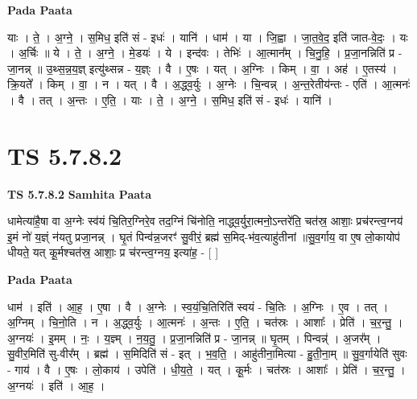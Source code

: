 \documentclass[17pt]{extarticle}
\begin{document}
\textbf{Pada Paata} \newline

याः । ते॒ । अ॒ग्ने॒ । स॒मिध॒ इति॑ सं - इधः॑ । यानि॑ । धाम॑ । या । जि॒ह्वा । जा॒त॒वे॒द॒ इति॑ जात-वे॒दः॒ । यः । अ॒र्चिः ॥ ये । ते॒ । अ॒ग्ने॒ । मे॒डयः॑ । ये । इन्द॑वः । तेभिः॑ । आ॒त्मान᳚म् । चि॒नु॒हि॒ । प्र॒जा॒नन्निति॑ प्र - जा॒नन्न् ॥ उ॒थ्स॒न्न॒य॒ज्ञ् इत्यु॑थ्सन्न - य॒ज्ञ्ः । वै । ए॒षः । यत् । अ॒ग्निः । किम् । वा॒ । अह॑ । ए॒तस्य॑ । क्रि॒यते᳚ । किम् । वा॒ । न । यत् । वै । अ॒द्ध्व॒र्युः । अ॒ग्नेः । चि॒न्वन्न् । अ॒न्त॒रेतीय॑न्तः - एति॑ । आ॒त्मनः॑ । वै । तत् । अ॒न्तः । ए॒ति॒ । याः । ते॒ । अ॒ग्ने॒ । स॒मिध॒ इति॑ सं - इधः॑ । यानि॑ ।  \newline




\section*{ TS 5.7.8.2 }

\textbf{TS 5.7.8.2 } \newline
\textbf{Samhita Paata} \newline

धामेत्या॑है॒षा वा अ॒ग्नेः स्व॑यं चि॒तिर॒ग्निरे॒व तद॒ग्निं चि॑नोति॒ नाद्ध्व॒र्युरा॒त्मनो॒ऽन्तरे॑ति॒ चत॑स्र॒ आशाः॒ प्रच॑रन्त्व॒ग्नय॑ इ॒मं नो॑ य॒ज्ञ्ं न॑यतु प्रजा॒नन्न्  । घृ॒तं पिन्व॑न्न॒जरꣳ॑ सु॒वीरं॒ ब्रह्म॑ स॒मिद्-भ॑व॒त्याहु॑तीनां ॥सु॒व॒र्गाय॒ वा ए॒ष लो॒कायोप॑ धीयते॒ यत् कू॒र्मश्चत॑स्र॒ आशाः॒ प्र च॑रन्त्व॒ग्नय॒ इत्या॑ह॒ - [  ] \newline

\textbf{Pada Paata} \newline

धाम॑ । इति॑ । आ॒ह॒ । ए॒षा । वै । अ॒ग्नेः । स्व॒यं॒चि॒तिरिति॑ स्वयं - चि॒तिः । अ॒ग्निः । ए॒व । तत् । अ॒ग्निम् । चि॒नो॒ति । न । अ॒द्ध्व॒र्युः । आ॒त्मनः॑ । अ॒न्तः । ए॒ति॒ । चत॑स्रः । आशाः᳚ । प्रेति॑ । च॒र॒न्तु॒ । अ॒ग्नयः॑ । इ॒मम् । नः॒ । य॒ज्ञ्म् । न॒य॒तु॒ । प्र॒जा॒नन्निति॑ प्र - जा॒नन्न् ॥ घृ॒तम् । पिन्वन्न्॑ । अ॒जर᳚म् । सु॒वीर॒मिति॑ सु-वीर᳚म् । ब्रह्म॑ । स॒मिदिति॑ सं - इत् । भ॒व॒ति॒ । आहु॑तीना॒मित्या - हु॒ती॒ना॒म् ॥ सु॒व॒र्गायेति॑ सुवः - गाय॑ । वै । ए॒षः । लो॒काय॑ । उपेति॑ । धी॒य॒ते॒ । यत् । कू॒र्मः । चत॑स्रः । आशाः᳚ । प्रेति॑ । च॒र॒न्तु॒ । अ॒ग्नयः॑ । इति॑ । आ॒ह॒ ।  \newline




\end{document}
